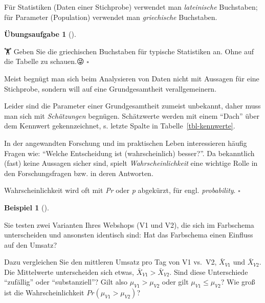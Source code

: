 \documentclass[
  ngerman,
  letterpaper,
  twoside,
  open=any]{scrbook}
\theoremstyle{definition}
\newtheorem{example}{Beispiel}[chapter]
\theoremstyle{plain}
\theoremstyle{definition}
\newtheorem{exercise}{Übungsaufgabe}[chapter]
\theoremstyle{definition}
\theoremstyle{remark}
\begin{document}
Für Statistiken (Daten einer Stichprobe) verwendet man
\emph{lateinische} Buchstaben; für Parameter (Population) verwendet man
\emph{griechische} Buchstaben.

\begin{exercise}[]\protect\hypertarget{exr-greek}{}\label{exr-greek}

🏋️ Geben Sie die griechischen Buchstaben für typische Statistiken an.
Ohne auf die Tabelle zu schauen.😜 \(\square\)

\end{exercise}

Meist begnügt man sich beim Analysieren von Daten nicht mit Aussagen für
eine Stichprobe, sondern will auf eine Grundgesamtheit verallgemeinern.

Leider sind die Parameter einer Grundgesamtheit zumeist unbekannt, daher
muss man sich mit \emph{Schätzungen} begnügen. Schätzwerte werden mit
einem \enquote{Dach} über dem Kennwert gekennzeichnet, s. letzte Spalte
in Tabelle~\ref{tbl-kennwerte}.

In der angewandten Forschung und im praktischen Leben interessieren
häufig Fragen wie: \enquote{Welche Entscheidung ist (wahrscheinlich)
besser?}. Da bekanntlich (fast) keine Aussagen sicher sind, spielt
\emph{Wahrscheinlichkeit} eine wichtige Rolle in den Forschungsfragen
bzw. in deren Antworten.

\begin{tcolorbox}[enhanced jigsaw, arc=.35mm, bottomrule=.15mm, bottomtitle=1mm, breakable, colback=white, colbacktitle=quarto-callout-note-color!10!white, colframe=quarto-callout-note-color-frame, coltitle=black, left=2mm, leftrule=.75mm, opacityback=0, opacitybacktitle=0.6, rightrule=.15mm, title=\textcolor{quarto-callout-note-color}{\faInfo}\hspace{0.5em}{Hinweis}, titlerule=0mm, toprule=.15mm, toptitle=1mm]

Wahrscheinlichkeit wird oft mit \emph{Pr} oder \emph{p} abgekürzt, für
engl. \emph{probability}. \(\square\)

\end{tcolorbox}

\begin{example}[]\protect\hypertarget{exm-inf}{}\label{exm-inf}

Sie testen zwei Varianten Ihres Webshops (V1 und V2), die sich im
Farbschema unterscheiden und ansonsten identisch sind: Hat das
Farbschema einen Einfluss auf den Umsatz?

Dazu vergleichen Sie den mittleren Umsatz pro Tag von V1 vs.~V2,
\(\bar{X}_{V1}\) und \(\bar{X}_{V2}\). Die Mittelwerte unterscheiden
sich etwas, \(\bar{X}_{V1} > \bar{X}_{V2}\). Sind diese Unterschiede
\enquote{zufällig} oder \enquote{substanziell}? Gilt also
\(\mu_{V1} > \mu_{V2}\) oder gilt \(\mu_{V1} \le \mu_{V2}\)? Wie groß
ist die Wahrscheinlichkeit \(Pr(\mu_{V1} > \mu_{V2})\)?

\end{example}
\end{document}
